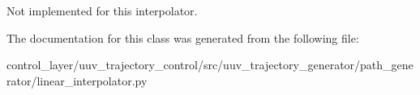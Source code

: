 \begin{DoxyVerb}Not implemented for this interpolator.\end{DoxyVerb}
 

The documentation for this class was generated from the following file\+:\begin{DoxyCompactItemize}
\item 
control\+\_\+layer/uuv\+\_\+trajectory\+\_\+control/src/uuv\+\_\+trajectory\+\_\+generator/path\+\_\+generator/linear\+\_\+interpolator.\+py\end{DoxyCompactItemize}
